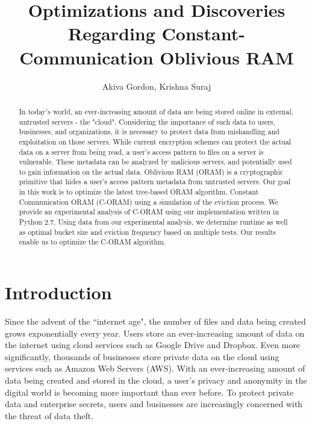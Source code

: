 \documentclass[12pt, oneside]{article}   	%
\title{Optimizations and Discoveries Regarding Constant-Communication Oblivious RAM}
\author{Akiva Gordon, Krishna Suraj}
\date{}							%
\begin{document}
\maketitle

\begin{abstract}
In today's world, an ever-increasing amount of data are being stored online in external, untrusted servers - the "cloud". Considering the importance of such data to users, businesses, and organizations, it is necessary to protect data from mishandling and exploitation on those servers. While current encryption schemes can protect the actual data on a server from being read, a user's access pattern to files on a server is vulnerable. These metadata can be analyzed by malicious servers, and potentially used to gain information on the actual data. Oblivious RAM (ORAM) is a cryptographic primitive that hides a user's access pattern metadata from untrusted servers. Our goal in this work is to optimize the latest tree-based ORAM algorithm, Constant Communication ORAM (C-ORAM) using a simulation of the eviction process. We provide an experimental analysis of C-ORAM using our implementation written in Python 2.7. Using data from our experimental analysis, we determine runtime as well as optimal bucket size and eviction frequency based on multiple tests. Our results enable us to optimize the C-ORAM algorithm. 

\end{abstract}


\section{Introduction}
Since the advent of the ``internet age", the number of files and data being created grows exponentially every year. Users store an ever-increasing amount of data on the internet using cloud services such as Google Drive and Dropbox. Even more significantly, thousands of businesses store private data on the cloud using services such as Amazon Web Servers (AWS). With an ever-increasing amount of data being created and stored in the cloud, a user's privacy and anonymity in the digital world is becoming more important than ever before. To protect private data and enterprise secrets, users and businesses are increasingly concerned with the threat of data theft.
\end{document}
